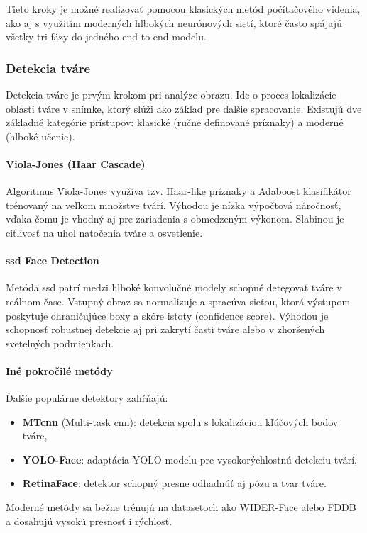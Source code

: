 Tieto kroky je možné realizovať pomocou klasických metód počítačového videnia, ako aj s využitím moderných hlbokých neurónových sietí, ktoré často spájajú všetky tri fázy do jedného end-to-end modelu.

\subsubsection{Detekcia tváre}
Detekcia tváre je prvým krokom pri analýze obrazu. Ide o proces lokalizácie oblasti tváre v snímke, ktorý slúži ako základ pre ďalšie spracovanie. Existujú dve základné kategórie prístupov: klasické (ručne definované príznaky) a moderné (hlboké učenie).

\paragraph{Viola-Jones (Haar Cascade)}
Algoritmus Viola-Jones využíva tzv. Haar-like príznaky a Adaboost klasifikátor trénovaný na veľkom množstve tvárí. Výhodou je nízka výpočtová náročnosť, vďaka čomu je vhodný aj pre zariadenia s obmedzeným výkonom. Slabinou je citlivosť na uhol natočenia tváre a osvetlenie.

\paragraph{\gls{ssd} Face Detection}
Metóda \gls{ssd} patrí medzi hlboké konvolučné modely schopné detegovať tváre v reálnom čase. Vstupný obraz sa normalizuje a spracúva sieťou, ktorá výstupom poskytuje ohraničujúce boxy a skóre istoty (confidence score). Výhodou je schopnosť robustnej detekcie aj pri zakrytí časti tváre alebo v zhoršených svetelných podmienkach.

\paragraph{Iné pokročilé metódy}
Ďalšie populárne detektory zahŕňajú:
\begin{itemize}
    \item \textbf{MT\gls{cnn}} (Multi-task \gls{cnn}): detekcia spolu s lokalizáciou kľúčových bodov tváre,
    \item \textbf{YOLO-Face}: adaptácia YOLO modelu pre vysokorýchlostnú detekciu tvárí,
    \item \textbf{RetinaFace}: detektor schopný presne odhadnúť aj pózu a tvar tváre.
\end{itemize}

Moderné metódy sa bežne trénujú na datasetoch ako WIDER-Face alebo FDDB a dosahujú vysokú presnosť i rýchlosť.

